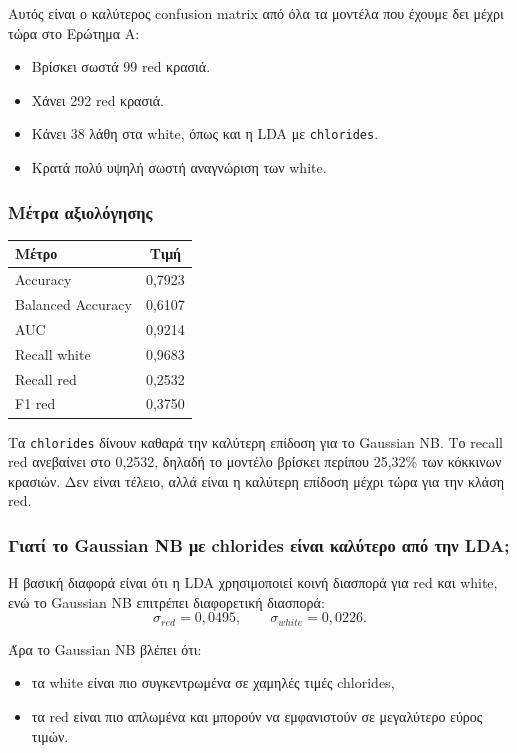 \documentclass[11pt,a4paper]{article}
\newcommand{\code}[1]{\texttt{#1}}
\begin{document}
Αυτός είναι ο καλύτερος confusion matrix από όλα τα μοντέλα που έχουμε δει
μέχρι τώρα στο Ερώτημα Α:
\begin{itemize}
    \item Βρίσκει σωστά 99 red κρασιά.
    \item Χάνει 292 red κρασιά.
    \item Κάνει 38 λάθη στα white, όπως και η LDA με \code{chlorides}.
    \item Κρατά πολύ υψηλή σωστή αναγνώριση των white.
\end{itemize}

\subsubsection{Μέτρα αξιολόγησης}

\begin{center}
\begin{tabular}{lc}
\toprule
Μέτρο & Τιμή \\
\midrule
Accuracy & 0,7923 \\
Balanced Accuracy & 0,6107 \\
AUC & 0,9214 \\
Recall white & 0,9683 \\
Recall red & 0,2532 \\
F1 red & 0,3750 \\
\bottomrule
\end{tabular}
\end{center}

Τα \code{chlorides} δίνουν καθαρά την καλύτερη επίδοση για το Gaussian NB. Το
recall red ανεβαίνει στο 0,2532, δηλαδή το μοντέλο βρίσκει περίπου 25,32\%
των κόκκινων κρασιών. Δεν είναι τέλειο, αλλά είναι η καλύτερη επίδοση μέχρι
τώρα για την κλάση red.

\subsubsection{Γιατί το Gaussian NB με chlorides είναι καλύτερο από την LDA;}

Η βασική διαφορά είναι ότι η LDA χρησιμοποιεί κοινή διασπορά για red και
white, ενώ το Gaussian NB επιτρέπει διαφορετική διασπορά:
\[
\sigma_{red}=0{,}0495,
\qquad
\sigma_{white}=0{,}0226.
\]

Άρα το Gaussian NB βλέπει ότι:
\begin{itemize}
    \item τα white είναι πιο συγκεντρωμένα σε χαμηλές τιμές chlorides,
    \item τα red είναι πιο απλωμένα και μπορούν να εμφανιστούν σε μεγαλύτερο
    εύρος τιμών.
\end{itemize}
\end{document}
